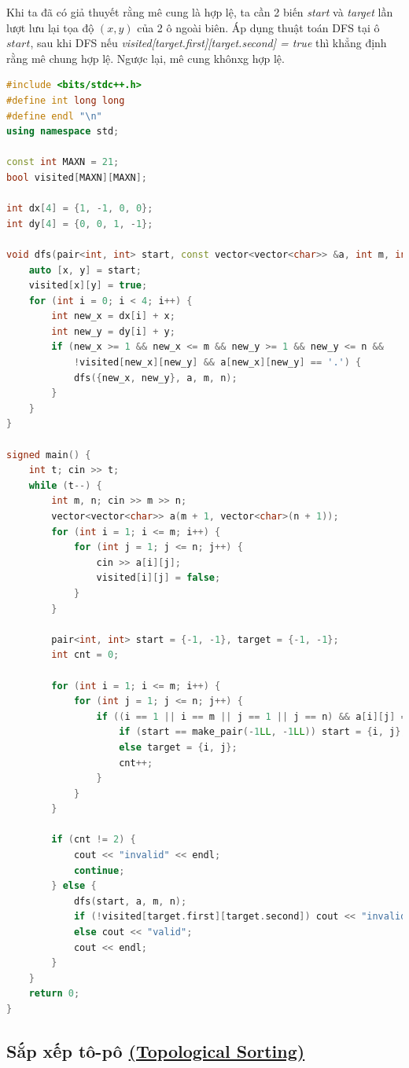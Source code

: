 \documentclass{article}
\begin{document}
Khi ta đã có giả thuyết rằng mê cung là hợp lệ, ta cần 2 biến \textit{start} và \textit{target} lần lượt lưu lại tọa độ $(x, y)$ của 2 ô ngoài biên. Áp dụng thuật toán DFS tại ô $start$, sau khi DFS nếu \textit{visited[target.first][target.second] = true} thì khẳng định rằng mê chung hợp lệ. Ngược lại, mê cung khônxg hợp lệ.
\begin{lstlisting}[language=C++, caption={Cài đặt C++ bài MAKEMAZE}, label={code:makemaze}]
#include <bits/stdc++.h>
#define int long long
#define endl "\n"
using namespace std;

const int MAXN = 21;
bool visited[MAXN][MAXN];

int dx[4] = {1, -1, 0, 0};
int dy[4] = {0, 0, 1, -1};

void dfs(pair<int, int> start, const vector<vector<char>> &a, int m, int n) {
    auto [x, y] = start;
    visited[x][y] = true;
    for (int i = 0; i < 4; i++) {
        int new_x = dx[i] + x;
        int new_y = dy[i] + y;
        if (new_x >= 1 && new_x <= m && new_y >= 1 && new_y <= n &&
            !visited[new_x][new_y] && a[new_x][new_y] == '.') {
            dfs({new_x, new_y}, a, m, n);
        }
    }
}

signed main() {
    int t; cin >> t;
    while (t--) {
        int m, n; cin >> m >> n;
        vector<vector<char>> a(m + 1, vector<char>(n + 1));
        for (int i = 1; i <= m; i++) {
            for (int j = 1; j <= n; j++) {
                cin >> a[i][j];
                visited[i][j] = false;
            }
        }

        pair<int, int> start = {-1, -1}, target = {-1, -1};
        int cnt = 0;

        for (int i = 1; i <= m; i++) {
            for (int j = 1; j <= n; j++) {
                if ((i == 1 || i == m || j == 1 || j == n) && a[i][j] == '.') {
                    if (start == make_pair(-1LL, -1LL)) start = {i, j};
                    else target = {i, j};
                    cnt++;
                }
            }
        }

        if (cnt != 2) {
            cout << "invalid" << endl;
            continue;
        } else {
            dfs(start, a, m, n);
            if (!visited[target.first][target.second]) cout << "invalid";
            else cout << "valid";
            cout << endl;
        }
    }
    return 0;
}

\end{lstlisting}

\subsection{Sắp xếp tô-pô \href{https://wiki.vnoi.info/algo/graph-theory/topological-sort.md}{(Topological Sorting)}}
\end{document}
